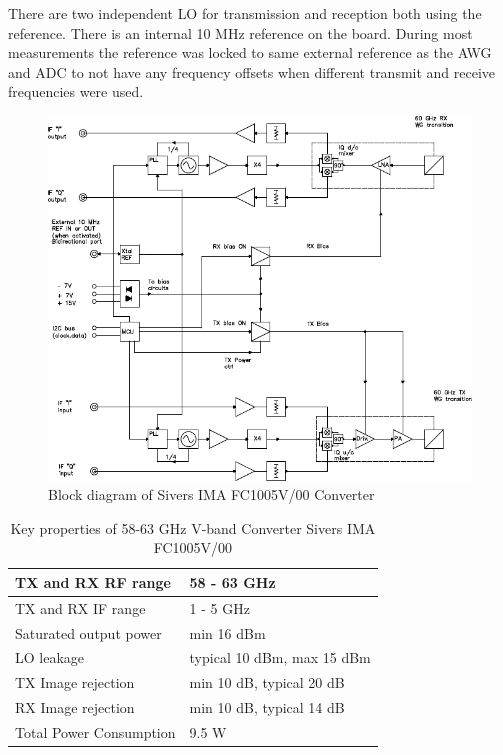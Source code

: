There are two independent \gls{LO} for transmission and reception both using
the reference. There is an internal 10 MHz reference on the board. During
most measurements the reference was locked to same external reference as the
\gls{AWG} and \gls{ADC} to not have any frequency offsets when different
transmit and receive frequencies were used.

\begin{figure}
  \centering
  \includegraphics[width=\textwidth]{figures/sivers_block_diagram}
  \caption{Block diagram of Sivers IMA FC1005V/00 Converter}
  \label{fig:sivers}
\end{figure}

\begin{table}[h]
  \centering
  \begin{tabular}{|l|l|}
    \hline
    \gls{TX} and \gls{RX} \gls{RF} range & 58 - 63 GHz \\ \hline
    \gls{TX} and \gls{RX} \gls{IF} range & 1 - 5 GHz \\ \hline
    Saturated output power & min 16 dBm \\ \hline
    \gls{LO} leakage & typical 10 dBm, max 15 dBm \\ \hline
    \gls{TX} Image rejection & min 10 dB, typical 20 dB \\ \hline
    \gls{RX} Image rejection & min 10 dB, typical 14 dB \\ \hline
    Total Power Consumption & 9.5 W \\ \hline
  \end{tabular}
  \caption{Key properties of 58-63 GHz V-band Converter Sivers IMA FC1005V/00}
  \label{tab:awg}
\end{table}

